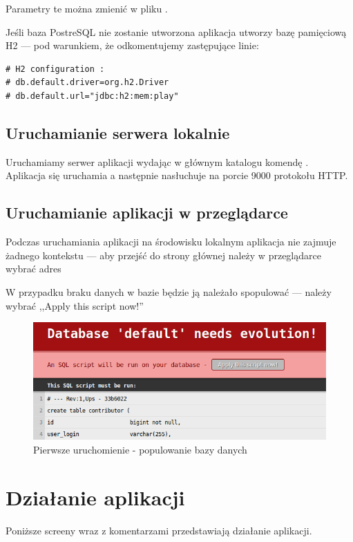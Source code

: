 \documentclass[a4paper,12pt,notitlepage]{mwrep}
\begin{document}
Parametry te można zmienić w pliku . \de

Jeśli baza PostreSQL nie zostanie utworzona aplikacja utworzy bazę pamięciową H2 ---
pod warunkiem, że odkomentujemy zastępujące linie:
\begin{verbatim}
# H2 configuration :
# db.default.driver=org.h2.Driver
# db.default.url="jdbc:h2:mem:play"
\end{verbatim}

\section{Uruchamianie serwera lokalnie}
Uruchamiamy serwer aplikacji wydając w głównym katalogu komendę .\\
Aplikacja się uruchamia a następnie nasłuchuje na porcie 9000 protokołu HTTP.\\


\section{Uruchamianie aplikacji w przeglądarce}
Podczas uruchamiania aplikacji na środowisku lokalnym aplikacja nie zajmuje żadnego kontekstu
--- aby przejść do strony głównej należy w przeglądarce wybrać adres \de

W przypadku braku danych w bazie będzie ją należało spopulować --- należy wybrać ,,Apply this script now!''
\begin{figure}[H]
\centering
\includegraphics[scale=0.8]{images/run.png}
\caption{Pierwsze uruchomienie - populowanie bazy danych}
\label{fig:populate}
\end{figure}


\chapter{Działanie aplikacji}
Poniższe screeny wraz z komentarzami przedstawiają działanie aplikacji.
\end{document}
